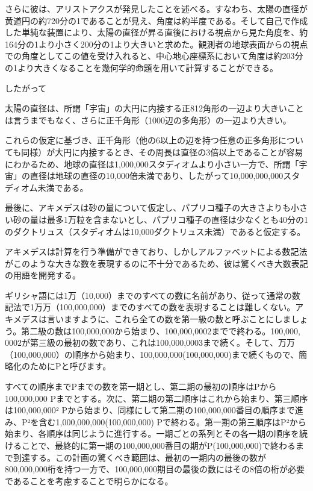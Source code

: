 \documentclass[a4paper,11pt,openany]{ltjsbook}
\begin{document}
さらに彼は、アリストアクスが発見したことを述べる。すなわち、太陽の直径が黄道円の約720分の1であることが見え、角度は約半度である。そして自己で作成した単純な装置により、太陽の直径が昇る直後における視点から見た角度を、約164分の1より小さく200分の1より大きいと求めた。観測者の地球表面からの視点での角度としてこの値を受け入れると、中心地心座標系において角度は約203分の1より大きくなることを幾何学的命題を用いて計算することができる。

したがって

太陽の直径は、所謂「宇宙」の大円に内接する正812角形の一辺より大きいことは言うまでもなく、さらに正千角形（1000辺の多角形）の一辺より大きい。

これらの仮定に基づき、正千角形（他の6以上の辺を持つ任意の正多角形についても同様）が大円に内接するとき、その周長は直径の3倍以上であることが容易にわかるため、地球の直径は1,000,000スタディオムより小さい一方で、所謂「宇宙」の直径は地球の直径の10,000倍未満であり、したがって10,000,000,000スタディオム未満である。

最後に、アキメデスは砂の量について仮定し、パプリコ種子の大きさよりも小さい砂の量は最多1万粒を含まないとし、パプリコ種子の直径は少なくとも40分の1のダクトリュス（スタディオムは10,000ダクトリュス未満）であると仮定する。

アキメデスは計算を行う準備ができており、しかしアルファベットによる数記法がこのような大きな数を表現するのに不十分であるため、彼は驚くべき大数表記の用語を開発する。

ギリシャ語には1万（10,000）までのすべての数に名前があり、従って通常の数記法で1万万（100,000,000）までのすべての数を表現することは難しくない。アキメデスは言いますように、これら全ての数を第一級の数と呼ぶことにしましょう。第二級の数は100,000,000から始まり、100,000,$000{2}$までで終わる。100,000,$000{2}$が第三級の最初の数であり、これは100,000,$000{3}$まで続く。そして、万万（100,000,000）の順序から始まり、100,000,000(100,000,000)まで続くもので、簡略化のためにPと呼びます。

すべての順序までPまでの数を第一期とし、第二期の最初の順序はPから100,000,000 Pまでとする。次に、第二期の第二順序はこれから始まり、第三順序は100,000,000² Pから始まり、同様にして第二期の100,000,000番目の順序まで進み、P²を含む1,000,000,000(100,000,000) Pで終わる。第一期の第三順序はP²から始まり、各順序は同じように進行する。一期ごとの系列とその各一期の順序を続けることで、最終的に第一期の100,000,000番目の期がP(100,000,000)で終わるまで到達する。この計画の驚くべき範囲は、最初の一期内の最後の数が800,000,000桁を持つ一方で、100,000,000期目の最後の数にはその8倍の桁が必要であることを考慮することで明らかになる。
\end{document}
